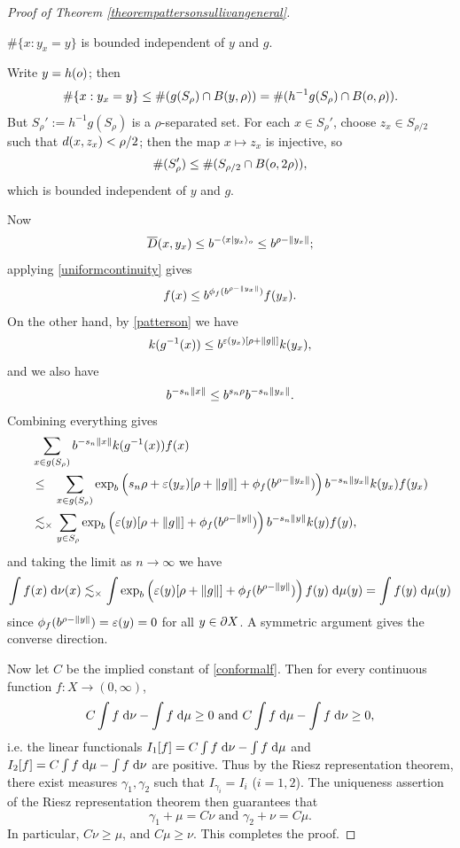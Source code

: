 \begin{proof}[Proof of Theorem \ref{theorempattersonsullivangeneral}]
\begin{subproof}
\begin{observation}
$\#\{x : y_x = y\}$ is bounded independent of $y$ and $g$.
\end{observation}
\begin{subproof}
Write $y = h(o)$; then
\[
\#\{x : y_x = y\} \leq \#(g(S_\rho)\cap B(y,\rho)) = \#(h^{-1}g(S_\rho)\cap B(o,\rho)).
\]
But $S_\rho' := h^{-1}g(S_\rho)$ is a $\rho$-separated set. For each $x\in S_\rho'$, choose $z_x\in S_{\rho/2}$ such that $d(x,z_x) < \rho/2$; then the map $x\mapsto z_x$ is injective, so
\[
\#(S_\rho') \leq \#(S_{\rho/2}\cap B(o,2\rho)),
\]
which is bounded independent of $y$ and $g$.
\end{subproof}
Now
\[
\overline{D}(x,y_x) \leq b^{-\langle x|y_x\rangle_o} \leq b^{\rho - \|y_x\|};
\]
applying \eqref{uniformcontinuity} gives
\[
f(x) \leq b^{\phi_f(b^{\rho - \|y_x\|})} f(y_x).
\]
On the other hand, by \eqref{patterson} we have
\[
k(g^{-1}(x)) \leq b^{\varepsilon(y_x) [\rho + \|g\|]} k(y_x),
\]
and we also have
\[
b^{-s_n \|x\|} \leq b^{s_n \rho} b^{-s_n \|y_x\|}.
\]
Combining everything gives
\begin{align*}
&\sum_{x\in g(S_\rho)}b^{-s_n\dox x} k(g^{-1}(x)) f(x)\\
&\leq_\pt \sum_{x\in g(S_\rho)} \exp_b\left(s_n \rho + \epsilon(y_x)[\rho + \dogo g] + \phi_f(b^{\rho - \dox{y_x}})\right) b^{-s_n\dox{y_x}} k(y_x) f(y_x)\\
&\lesssim_\times \sum_{y\in S_\rho} \exp_b\left(\epsilon(y)[\rho + \dogo g] + \phi_f(b^{\rho - \dox y})\right) b^{-s_n\dox y} k(y) f(y),
\end{align*}
and taking the limit as $n\to\infty$ we have
\[
\int f(x) \;\mathrm{d} \nu(x) \lesssim_\times \int \exp_b\left(\varepsilon(y)[\rho + \|g\|] + \phi_f(b^{\rho - \|y\|})\right) f(y)\;\mathrm{d}\mu(y) = \int f(y)\;\mathrm{d}\mu(y)
\]
since $\phi_f(b^{\rho - \|y\|}) = \varepsilon(y) = 0$ for all $y\in\partial X$. A symmetric argument gives the converse direction.
\end{subproof}
Now let $C$ be the implied constant of \eqref{conformalf}. Then for every continuous function $f:X\to (0,\infty)$,
\[
C\int f\;\mathrm{d}\nu - \int f\;\mathrm{d}\mu \geq 0 \textup{ and }C\int f \;\mathrm{d} \mu - \int f\;\mathrm{d}\nu \geq 0,
\]
i.e. the linear functionals $I_1[f] = C\int f\;\mathrm{d}\nu - \int f\;\mathrm{d}\mu$ and $I_2[f] = C\int f \;\mathrm{d} \mu - \int f\;\mathrm{d}\nu$ are positive. Thus by the Riesz representation theorem, there exist measures $\gamma_1,\gamma_2$ such that $I_{\gamma_i} = I_i$ ($i = 1,2$). The uniqueness assertion of the Riesz representation theorem then guarantees that
\begin{equation}
\label{riesz}
\gamma_1 + \mu = C\nu \text{ and } \gamma_2 + \nu = C\mu.
\end{equation}
In particular, $C\nu \geq \mu$, and $C\mu \geq \nu$. This completes the proof.
\end{proof}
